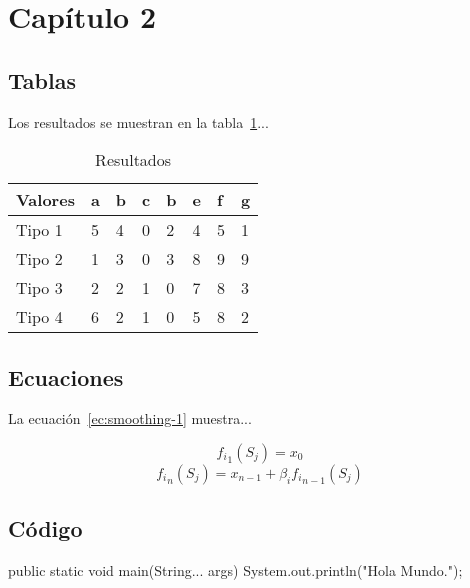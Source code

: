 \section{Capítulo 2}

\subsection{Tablas}

Los resultados se muestran en la tabla~\ref{table:resultados}...

\begin{table}[H]
    \begin{center}
        \caption{Resultados\label{table:resultados}}
        \begin{tabular}{|l|l|l|l|l|l|l|l|}
        \hline
        Valores    & a & b & c & b & e  & f & g \\
        \hline
        Tipo 1     & 5 & 4 & 0 & 2 &  4 & 5 &  1  \\
        Tipo 2     & 1 & 3 & 0 & 3 &  8 & 9 &  9  \\
        Tipo 3     & 2 & 2 & 1 & 0 &  7 & 8 &  3  \\
        Tipo 4     & 6 & 2 & 1 & 0 &  5 & 8 &  2  \\
        \hline
        \end{tabular}
    \end{center}
\end{table}

\subsection{Ecuaciones}

La ecuación~\ref{ec:smoothing-1} muestra...

\begin{equation} \label{ec:smoothing-1}
 {f_i}_1 (S_j) = x_{0}
\end{equation} 
\begin{equation} \label{ec:smoothing-2}
 {f_i}_n (S_j) =  x_{n-1} + \beta_i {f_i}_{n-1} (S_j)
\end{equation} 

\subsection{Código}

\begin{codigojava}
public static void main(String... args) {
    System.out.println("Hola Mundo.");
}
\end{codigojava}

